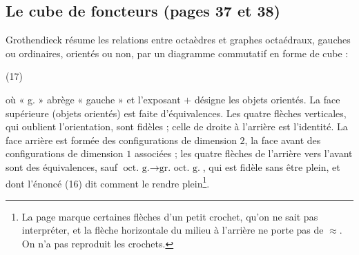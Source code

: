\documentclass[11pt,a4paper]{article}
\begin{document}
\subsection*{Le cube de foncteurs (pages 37 et 38)}

Grothendieck résume les relations entre octaèdres et graphes octaédraux,
gauches ou ordinaires, orientés ou non, par un diagramme commutatif en forme
de cube :

(17)


où « g. » abrège « gauche » et l'exposant $+$ désigne les objets orientés.
La face supérieure (objets orientés) est faite d'équivalences. Les quatre
flèches verticales, qui oublient l'orientation, sont fidèles ; celle de
droite à l'arrière est l'identité. La face arrière est formée des
configurations de dimension $2$, la face avant des configurations de
dimension $1$ associées ; les quatre flèches de l'arrière vers l'avant sont
des équivalences, sauf $\text{oct.\ g.} \to \text{gr.\ oct.\ g.}$, qui est
fidèle sans être plein, et dont l'énoncé (16) dit comment le rendre
plein\footnote{La page marque certaines flèches d'un petit crochet, qu'on ne
sait pas interpréter, et la flèche horizontale du milieu à l'arrière ne porte
pas de $\approx$. On n'a pas reproduit les crochets.}.
\end{document}
